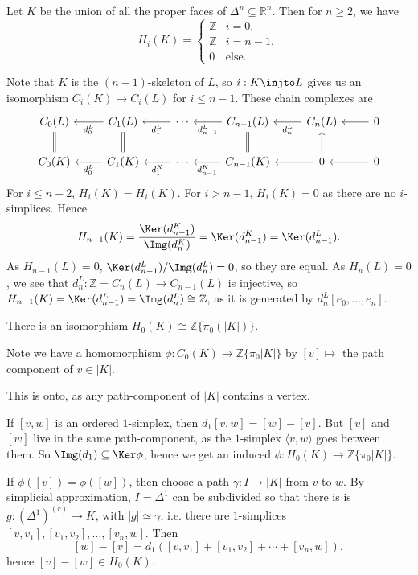 \documentclass[12pt]{article}
\begin{document}
\begin{corollary}
	Let $K$ be the union of all the proper faces of $\Delta^n \subseteq \mathbb{R}^n$. Then for $n \geq 2$, we have
	\[
		H_i(K) =
		\begin{cases}
			\mathbb{Z} & i = 0, \\
			\mathbb{Z} & i = n-1, \\
			0 & \text{else}.
		\end{cases}
	\]
\end{corollary}

\begin{proofbox}
	Note that $K$ is the $(n-1)$-skeleton of $L$, so $i : K \injto L$ gives us an isomorphism $C_i(K) \to C_i(L)$ for $i \leq n-1$. These chain complexes are
	\[
	\begin{tikzcd}
		C_0(L) & C_1(L) \arrow[l, "d_0^L"] & \cdots \arrow[l, "d_1^L"] & C_{n-1}(L) \arrow[l, "d_{n-1}^L"] & C_n(L) \arrow[l, "d_n^L"] & 0 \arrow[l] \\
		C_0(K) \arrow[u, equal] & C_1(K) \arrow[l, "d_0^L"] \arrow[u, equal] & \cdots \arrow[l, "d_1^K"] & C_{n-1}(K) \arrow[l, "d_{n-1}^K"] \arrow[u, equal] & 0 \arrow[l] \arrow[u] & 0 \arrow[l]
	\end{tikzcd}
	\]
	For $i \leq n-2$, $H_i(K) = H_i(K)$. For $i > n-1$, $H_i(K) = 0$ as there are no $i$-simplices. Hence
	\[
	H_{n-1}(K) = \frac{\Ker(d_{n-1}^K)}{\Img(d_n^K)} = \Ker(d_{n-1}^K) = \Ker(d_{n-1}^L).
	\]
	As $H_{n-1}(L) = 0$, $\Ker(d_{n-1}^L)/\Img(d_{n}^L) = 0$, so they are equal. As $H_n(L) = 0$, we see that $d_n^L : \mathbb{Z} = C_n(L) \to C_{n-1}(L)$ is injective, so $H_{n-1}(K) = \Ker(d_{n-1}^L) = \Img(d_n^L) \cong \mathbb{Z}$, as it is generated by $d_n^L [e_0, \ldots, e_n]$.
\end{proofbox}

\begin{lemma}
	There is an isomorphism $H_0(K) \cong \mathbb{Z}\{\pi_0(|K|)\}$.
\end{lemma}


\begin{proofbox}
	Note we have a homomorphism $\phi : C_0(K) \to \mathbb{Z}\{\pi_0|K|\}$ by $[v] \mapsto$ the path component of $v \in |K|$.

	This is onto, as any path-component of $|K|$ contains a vertex.

	If $[v, w]$ is an ordered $1$-simplex, then $d_1[v, w] = [w] - [v]$. But $[v]$ and $[w]$ live in the same path-component, as the $1$-simplex $\langle v, w \rangle$ goes between them. So $\Img(d_1) \subseteq \Ker \phi$, hence we get an induced $\phi : H_0(K) \to \mathbb{Z}\{\pi_0|K|\}$.

	If $\phi([v]) = \phi([w])$, then choose a path $\gamma : I \to |K|$ from $v$ to $w$. By simplicial approximation, $I = \Delta^1$ can be subdivided so that there is is $g : (\Delta^1)^{(r)} \to K$, with $|g| \simeq \gamma$, i.e. there are $1$-simplices $[v, v_1], [v_1, v_2], \ldots, [v_n, w]$. Then
	\[
		[w] - [v] = d_1([v, v_1] + [v_1, v_2] + \cdots + [v_n, w]),
	\]
	hence $[v] - [w] \in H_0(K)$.
\end{proofbox}
\end{document}
